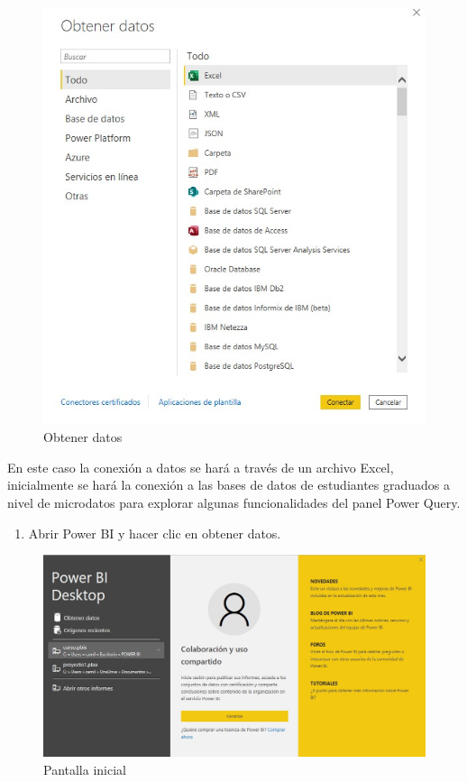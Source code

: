 \documentclass[
]{book}
\providecommand{\tightlist}{%
  \setlength{\itemsep}{0pt}\setlength{\parskip}{0pt}}
\begin{document}
\begin{figure}

{\centering \includegraphics[width=0.6\linewidth]{Imágenes/powerbi8} 

}

\caption{Obtener datos}\label{fig:obtenerdatospbi-fig}
\end{figure}

En este caso la conexión a datos se hará a través de un archivo Excel, inicialmente se hará la conexión a las bases de datos de estudiantes graduados a nivel de microdatos para explorar algunas funcionalidades del panel Power Query.

\begin{enumerate}
\def\labelenumi{\arabic{enumi}.}
\tightlist
\item
  Abrir Power BI y hacer clic en obtener datos.
\end{enumerate}

\begin{figure}

{\centering \includegraphics[width=0.8\linewidth]{Imágenes/powerbi9} 

}

\caption{Pantalla inicial}\label{fig:conexiondatos1-fig}
\end{figure}
\end{document}
